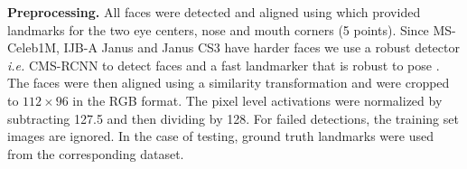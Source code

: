 \documentclass[10pt,twocolumn,letterpaper]{article}
\begin{document}

\textbf{Preprocessing.} All faces were detected and aligned using \cite{zhang2016joint} which provided landmarks for the two eye centers, nose and mouth corners (5 points). Since MS-Celeb1M, IJB-A Janus and Janus CS3 have harder faces we use a robust detector \emph{i.e.} CMS-RCNN \cite{zhu2017cms} to detect faces and a fast landmarker that is robust to pose \cite{bhagavatula2017faster}. The faces were then aligned using a similarity transformation and were cropped to $112\times 96$ in the RGB format. The pixel level activations were normalized by subtracting 127.5 and then dividing by 128. For failed detections, the training set images are ignored. In the case of testing, ground truth landmarks were used from the corresponding dataset.



\end{document}
